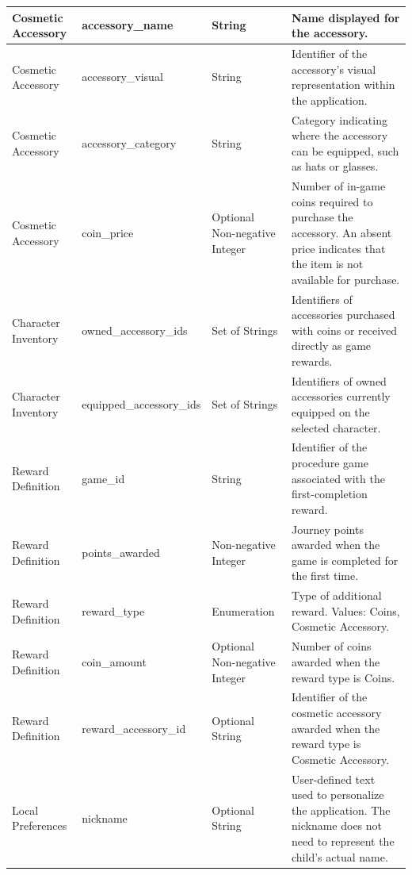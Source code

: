 \documentclass[12pt]{article}
\begin{document}
\begin{longtable}{
    p{}
    p{}
    p{}
    p{}
}
Cosmetic Accessory &
accessory\_name &
String &
Name displayed for the accessory. \\
\midrule

Cosmetic Accessory &
accessory\_visual &
String &
Identifier of the accessory's visual representation
within the application. \\
\midrule

Cosmetic Accessory &
accessory\_category &
String &
Category indicating where the accessory can
be equipped, such as hats or glasses. \\
\midrule

Cosmetic Accessory &
coin\_price &
Optional Non-negative Integer &
Number of in-game coins required to purchase
the accessory. An absent price indicates that
the item is not available for purchase. \\
\midrule

Character Inventory &
owned\_accessory\_ids &
Set of Strings &
Identifiers of accessories purchased with coins
or received directly as game rewards. \\
\midrule

Character Inventory &
equipped\_accessory\_ids &
Set of Strings &
Identifiers of owned accessories currently
equipped on the selected character. \\
\midrule

Reward Definition &
game\_id &
String &
Identifier of the procedure game associated
with the first-completion reward. \\
\midrule

Reward Definition &
points\_awarded &
Non-negative Integer &
Journey points awarded when the game is
completed for the first time. \\
\midrule

Reward Definition &
reward\_type &
Enumeration &
Type of additional reward.
Values: Coins, Cosmetic Accessory. \\
\midrule

Reward Definition &
coin\_amount &
Optional Non-negative Integer &
Number of coins awarded when the reward
type is Coins. \\
\midrule

Reward Definition &
reward\_accessory\_id &
Optional String &
Identifier of the cosmetic accessory awarded
when the reward type is Cosmetic Accessory. \\
\midrule

Local Preferences &
nickname &
Optional String &
User-defined text used to personalize the
application. The nickname does not need to
represent the child's actual name. \\
\midrule


\end{longtable}
\end{document}
